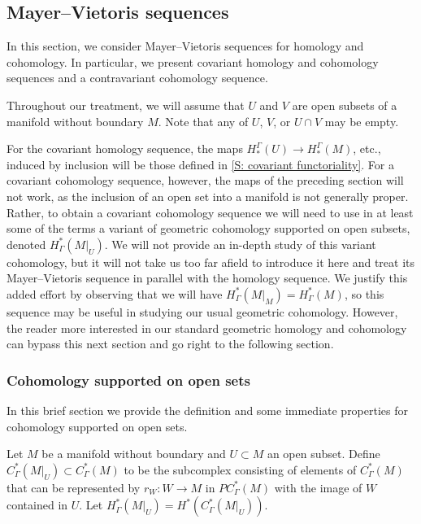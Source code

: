\subsection{Mayer--Vietoris sequences}\label{S: MV}

In this section, we consider Mayer--Vietoris sequences for homology and cohomology.
In particular, we present covariant homology and cohomology sequences and a contravariant cohomology sequence.

Throughout our treatment, we will assume that $U$ and $V$ are open subsets of a manifold without boundary $M$.
Note that any of $U$, $V$, or $U \cap V$ may be empty.

For the covariant homology sequence, the maps $H_*^\Gamma(U) \to H_*^\Gamma(M)$, etc., induced by inclusion will be those defined in \cref{S: covariant functoriality}.
For a covariant cohomology sequence, however, the maps of the preceding section will not work, as the inclusion of an open set into a manifold is not generally proper.
Rather, to obtain a covariant cohomology sequence we will need to use in at least some of the terms a variant of geometric cohomology supported on open subsets, denoted $H^*_\Gamma(M|_U)$.
We will not provide an in-depth study of this variant cohomology, but it will not take us too far afield to introduce it here and treat its Mayer--Vietoris sequence in parallel with the homology sequence.
We justify this added effort by observing that we will have $H^*_\Gamma(M|_M) = H^*_\Gamma(M)$, so this sequence may be useful in studying our usual geometric cohomology.
However, the reader more interested in our standard geometric homology and cohomology can bypass this next section and go right to the following section.


\subsubsection{Cohomology supported on open sets}

In this brief section we provide the definition and some immediate properties for cohomology supported on open sets.

\begin{definition}
	Let $M$ be a manifold without boundary and $U \subset M$ an open subset.
	Define $C_\Gamma^*(M|_U) \subset C_\Gamma^*(M)$ to be the subcomplex consisting of elements of $C_\Gamma^*(M)$ that can be represented by $r_W \colon W \to M$ in $PC^*_\Gamma(M)$ with the image of $W$ contained in $U$.
	Let $H_\Gamma^*(M|_U) = H^*(C_\Gamma^*(M|_U))$.
\end{definition}

